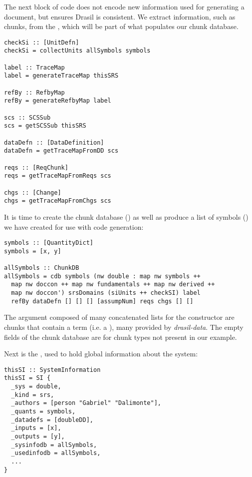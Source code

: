 The next block of code does not encode new information used for generating a document, but ensures Drasil is consistent. We extract information, such as chunks, from the , which will be part of what populates our chunk database.

\begin{tcolorbox}[breakable, toprule at break=0pt, bottomrule at break=0pt]
\begin{verbatim}
checkSi :: [UnitDefn]
checkSi = collectUnits allSymbols symbols

label :: TraceMap
label = generateTraceMap thisSRS

refBy :: RefbyMap
refBy = generateRefbyMap label

scs :: SCSSub
scs = getSCSSub thisSRS

dataDefn :: [DataDefinition]
dataDefn = getTraceMapFromDD scs

reqs :: [ReqChunk]
reqs = getTraceMapFromReqs scs

chgs :: [Change]
chgs = getTraceMapFromChgs scs
\end{verbatim}
\end{tcolorbox}

It is time to create the chunk database () as well as produce a list of symbols () we have created for use with code generation:

\begin{tcolorbox}
\begin{verbatim}
symbols :: [QuantityDict]
symbols = [x, y]

allSymbols :: ChunkDB
allSymbols = cdb symbols (nw double : map nw symbols ++
  map nw doccon ++ map nw fundamentals ++ map nw derived ++
  map nw doccon') srsDomains (siUnits ++ checkSI) label
  refBy dataDefn [] [] [] [assumpNum] reqs chgs [] []
\end{verbatim}
\end{tcolorbox}

The argument composed of many concatenated lists for the  constructor are chunks that contain a term (i.e. a ), many provided by \textit{drasil-data}. The empty fields of the chunk database are for chunk types not present in our example.

Next is the , used to hold global information about the system:

\begin{tcolorbox}[breakable, toprule at break=0pt, bottomrule at break=0pt]
\begin{verbatim}
thisSI :: SystemInformation
thisSI = SI {
  _sys = double,
  _kind = srs,
  _authors = [person "Gabriel" "Dalimonte"],
  _quants = symbols,
  _datadefs = [doubleDD],
  _inputs = [x],
  _outputs = [y],
  _sysinfodb = allSymbols,
  _usedinfodb = allSymbols,
  ...
}
\end{verbatim}
\end{tcolorbox}

